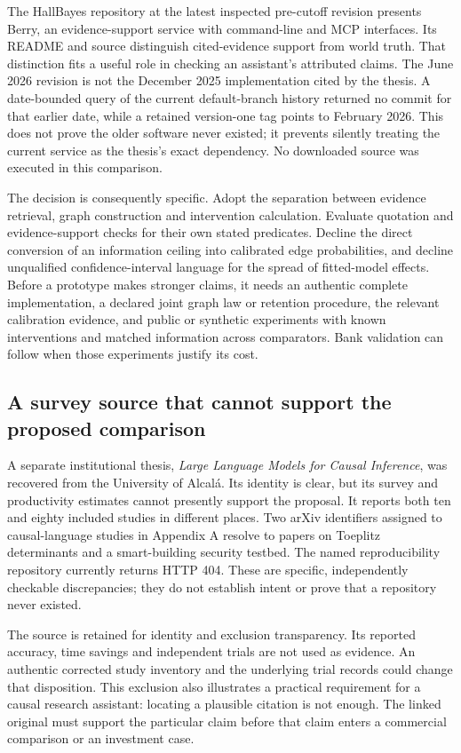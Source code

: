 The HallBayes repository at the latest inspected pre-cutoff revision presents
Berry, an evidence-support service with command-line and MCP interfaces.
Its README and source distinguish cited-evidence support from world truth.
That distinction fits a useful role in checking an assistant's attributed
claims. The June 2026 revision is not the December 2025 implementation cited
by the thesis. A date-bounded query of the current default-branch history
returned no commit for that earlier date, while a retained version-one tag
points to February 2026. This does not prove the older software never
existed; it prevents silently treating the current service as the thesis's
exact dependency. No downloaded source was executed in this comparison.
\citep{closure30berry}

The decision is consequently specific. Adopt the separation between
evidence retrieval, graph construction and intervention calculation.
Evaluate quotation and evidence-support checks for their own stated
predicates. Decline the direct conversion of an information ceiling into
calibrated edge probabilities, and decline unqualified confidence-interval
language for the spread of fitted-model effects. Before a prototype makes
stronger claims, it needs an authentic complete implementation, a declared
joint graph law or retention procedure, the relevant calibration evidence,
and public or synthetic experiments with known interventions and matched
information across comparators. Bank validation can follow when those
experiments justify its cost.

\subsection{A survey source that cannot support the proposed comparison}

A separate institutional thesis, \emph{Large Language Models for Causal
Inference}, was recovered from the University of Alcal\'a. Its identity is
clear, but its survey and productivity estimates cannot presently support
the proposal. It reports both ten and eighty included studies in different
places. Two arXiv identifiers assigned to causal-language studies in
Appendix A resolve to papers on Toeplitz determinants and a smart-building
security testbed. The named reproducibility repository currently returns
HTTP 404. These are specific, independently checkable discrepancies;
they do not establish intent or prove that a repository never existed.
\citep[Section 4.1, Tables 5--6 and 9, Section 5.4.3, Appendix A]
{closure30aitlhouss}

The source is retained for identity and exclusion transparency. Its reported
accuracy, time savings and independent trials are not used as evidence.
An authentic corrected study inventory and the underlying trial records
could change that disposition. This exclusion also illustrates a practical
requirement for a causal research assistant: locating a plausible citation
is not enough. The linked original must support the particular claim before
that claim enters a commercial comparison or an investment case.
